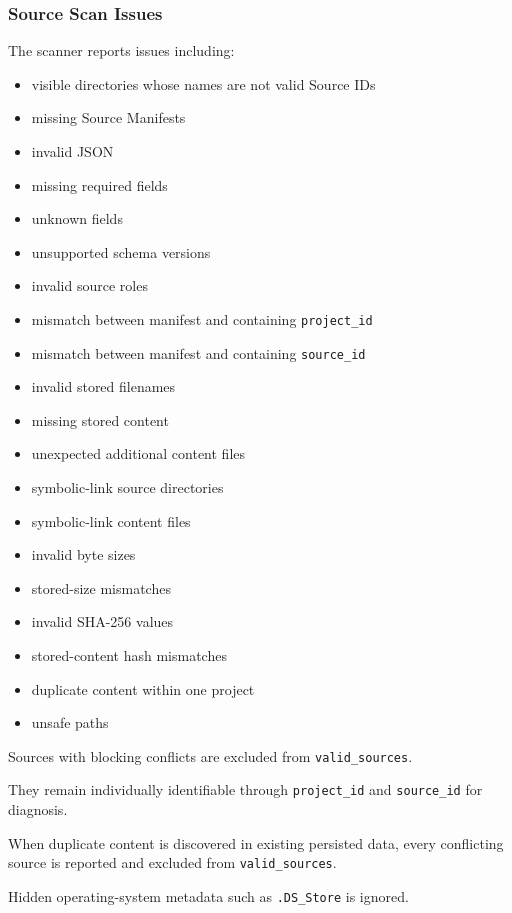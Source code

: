 \hypertarget{source-scan-issues}{%
\subsubsection{Source Scan Issues}\label{source-scan-issues}}

The scanner reports issues including:

\begin{itemize}
\tightlist
\item
  visible directories whose names are not valid Source IDs
\item
  missing Source Manifests
\item
  invalid JSON
\item
  missing required fields
\item
  unknown fields
\item
  unsupported schema versions
\item
  invalid source roles
\item
  mismatch between manifest and containing \texttt{project\_id}
\item
  mismatch between manifest and containing \texttt{source\_id}
\item
  invalid stored filenames
\item
  missing stored content
\item
  unexpected additional content files
\item
  symbolic-link source directories
\item
  symbolic-link content files
\item
  invalid byte sizes
\item
  stored-size mismatches
\item
  invalid SHA-256 values
\item
  stored-content hash mismatches
\item
  duplicate content within one project
\item
  unsafe paths
\end{itemize}

Sources with blocking conflicts are excluded from \texttt{valid\_sources}.

They remain individually identifiable through \texttt{project\_id} and \texttt{source\_id} for diagnosis.

When duplicate content is discovered in existing persisted data, every conflicting source is reported and excluded from \texttt{valid\_sources}.

Hidden operating-system metadata such as \texttt{.DS\_Store} is ignored.

